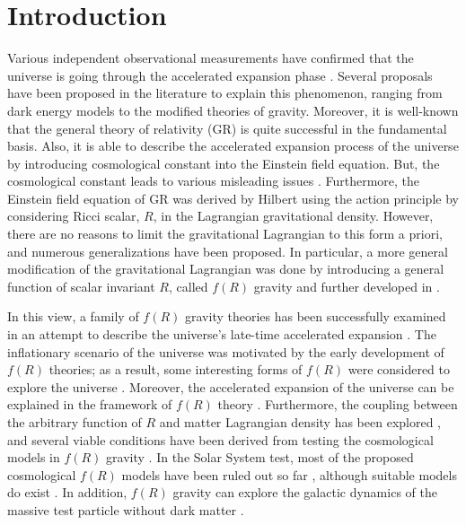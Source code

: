 \section{Introduction}
Various independent observational measurements have confirmed that the universe is going through the accelerated expansion phase \cite{ref1,ref2,ref3,ref4}. Several proposals have been proposed in the literature to explain this phenomenon, ranging from dark energy models to the modified theories of gravity. Moreover, it is well-known that the general theory of relativity (GR) is quite successful in the fundamental basis. Also, it is able to describe the accelerated expansion process of the universe by introducing cosmological constant into the Einstein field equation. But, the cosmological constant leads to various misleading issues \cite{ref5,ref6}. Furthermore, the Einstein field equation of GR was derived by Hilbert using the action principle by considering Ricci scalar, $R$, in the Lagrangian gravitational density. However, there are no reasons to limit the gravitational Lagrangian to this form a priori, and numerous generalizations have been proposed. In particular, a more general modification of the gravitational Lagrangian was done by introducing a general function of scalar invariant $R$, called $f(R)$ gravity \cite{ref7} and further developed in \cite{ref8,ref9}.

In this view, a family of $f(R)$ gravity theories has been successfully examined in an attempt to describe the universe's late-time accelerated expansion \cite{ref10,ref11}. The inflationary scenario of the universe was motivated by the early development of $f(R)$ theories; as a result, some interesting forms of $f(R)$ were considered to explore the universe \cite{ref12}. Moreover, the accelerated expansion of the universe can be explained in the framework of $f(R)$ theory \cite{ref13}. Furthermore, the coupling between the arbitrary function of $R$ and matter Lagrangian density has been explored \cite{ref14,ref15,ref16,ref17,ref18}, and several viable conditions have been derived from testing the cosmological models in $f(R)$ gravity \cite{ref19,ref20,ref21,ref22,ref23,ref24,ref25}. In the Solar System test, most of the proposed cosmological $f(R)$ models have been ruled out so far \cite{ref26,ref27,ref28,ref29,ref30,ref31}, although suitable models do exist \cite{ref32,ref33,ref34,ref35,ref36}. In addition, $f(R)$ gravity can explore the galactic dynamics of the massive test particle without dark matter \cite{ref37,ref38,ref39}.

